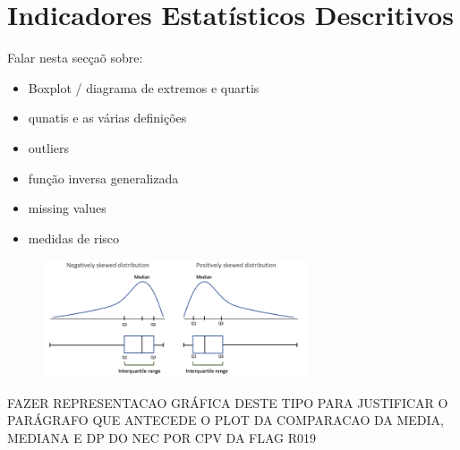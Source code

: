 \section{Indicadores Estatísticos Descritivos}

Falar nesta secçaõ sobre:

\begin{itemize}
	\item Boxplot / diagrama de extremos e quartis
	\item qunatis e as várias definições
	\item outliers
	\item função inversa generalizada
	\item missing values
	\item medidas de risco
\end{itemize}


\begin{figure}[H]
	\centering
	\includegraphics[width=0.7\textwidth]{imagens/skewed.png}
	\caption{}
	\label{}
\end{figure}

FAZER REPRESENTACAO GRÁFICA DESTE TIPO PARA JUSTIFICAR O PARÁGRAFO QUE ANTECEDE O PLOT DA COMPARACAO DA MEDIA, MEDIANA E DP DO NEC POR CPV DA FLAG R019